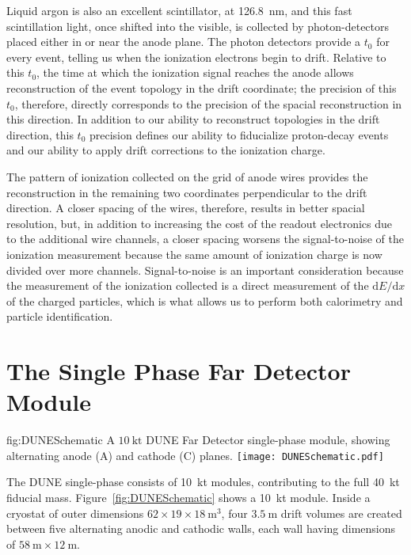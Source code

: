 Liquid argon is also an excellent scintillator, at \SI{126.8}{\nano\meter}, and this fast scintillation light, once shifted into the visible, is collected by photon-detectors placed either in or near the anode plane. The photon detectors provide a $t_{0}$ for every event, telling us when the ionization electrons begin to drift. Relative to this $t_{0}$, the time at which the ionization signal reaches the anode allows reconstruction of the event topology in the drift coordinate; the precision of this $t_{0}$, therefore, directly corresponds to the precision of the spacial reconstruction in this direction. In addition to our ability to reconstruct topologies in the drift direction, this $t_{0}$ precision defines our ability to fiducialize proton-decay events and our ability to apply drift corrections to the ionization charge.

The pattern of ionization collected on the grid of anode wires provides the reconstruction in the remaining two coordinates perpendicular to the drift direction. A closer spacing of the wires, therefore, results in better spacial resolution, but, in addition to increasing the cost of the readout electronics due to the additional wire channels, a closer spacing worsens the signal-to-noise of the ionization measurement because the same amount of ionization charge is now divided over more channels. Signal-to-noise is an important consideration because the measurement of the ionization collected is a direct measurement of the $\mathrm{d}E/\mathrm{d}x$ of the charged particles, which is what allows us to perform both calorimetry and particle identification.

\section{The  Single Phase Far Detector Module}
\label{sec:fdsp-exec-dunefd}

\begin{dunefigure}{fig:DUNESchematic}
{A $\SI{10}{\kilo\tonne}$ DUNE Far Detector single-phase module, showing alternating anode (A) and cathode (C) planes.}
\texttt{[image: DUNESchematic.pdf]}
\end{dunefigure}

The DUNE single-phase  consists of \SI{10}{\kilo\tonne} modules, contributing to the full \SI{40}{\kilo\tonne}  fiducial mass. Figure~\ref{fig:DUNESchematic} shows a \SI{10}{\kilo\tonne} module. Inside a cryostat of outer dimensions $62\times 19\times \SI{18}{\meter^{3}}$, four $\SI{3.5}{\meter}$ drift volumes are created between five alternating anodic and cathodic walls, each wall having dimensions of $\SI{58}{\meter}\times \SI{12}{\meter}$.

